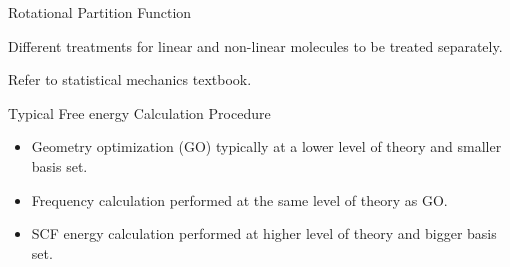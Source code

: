 \documentclass[aspectratio=169]{beamer}
\begin{document}
    \begin{frame}{Rotational Partition Function}

        Different treatments for linear and non-linear molecules to be treated separately.

        Refer to statistical mechanics textbook.

    \end{frame}


    \begin{frame}{Typical Free energy Calculation Procedure}

        \begin{figure}
            \centering
        \end{figure}
        \begin{itemize}
            \item Geometry optimization (GO) typically at a lower level of theory and smaller basis set.
            \item Frequency calculation performed at the same level of theory as GO.
            \item SCF energy calculation performed at higher level of theory and bigger basis set.
        \end{itemize}

    \end{frame}
\end{document}
